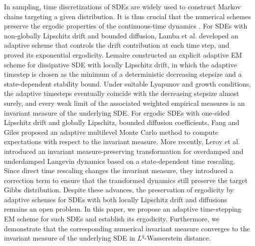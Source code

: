 \documentclass[preprint,12pt,compress]{elsarticle}
\begin{document}
In sampling, time discretizations of SDEs are widely used to construct Markov chains targeting a given distribution.
It is thus crucial that the numerical schemes preserve the ergodic properties of the continuous-time dynamics \cite{lamba2007an}. 
For SDEs with non-globally Lipschitz drift and bounded diffusion, Lamba et al. \cite{lamba2007an} developed an adaptive scheme that controls the drift contribution at each time step, and proved its exponential ergodicity.
Lemaire \cite{lemaire2007an} constructed an explicit adaptive EM scheme for dissipative SDE with locally Lipschitz drift, in which the adaptive timestep is chosen as the minimum of a deterministic decreasing stepsize and a state-dependent stability bound. Under suitable Lyapunov and growth conditions, the adaptive timesteps eventually coincide with the decreasing stepsize almost surely, and every weak limit of the associated weighted empirical measures is an invariant measure of the underlying SDE. 
For ergodic SDEs with one-sided Lipschitz drift and globally Lipschitz, bounded diffusion coefficients, Fang and Giles \cite{fang2020adaptive} proposed an adaptive multilevel Monte Carlo method to compute expectations with respect to the invariant measure. 
More recently, Leroy et al. \cite{leroy2024adaptive} introduced an invariant measure-preserving transformation for overdamped and underdamped Langevin dynamics based on a state-dependent time rescaling. Since direct time rescaling changes the invariant measure, they introduced a correction term to ensure that the transformed dynamics still preserve the target Gibbs distribution.
Despite these advances, the preservation of ergodicity by adaptive schemes for SDEs with both locally Lipschitz drift and diffusions remains an open problem. In this paper, we propose an adaptive time-stepping EM scheme for such SDEs and establish its ergodicity. Furthermore, we demonstrate that the corresponding numerical invariant measure converges to the invariant measure of the underlying SDE in $L^q$-Wasserstein distance. 
\end{document}
